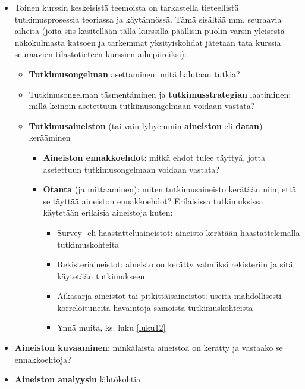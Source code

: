 \documentclass[
]{book}
\providecommand{\tightlist}{%
  \setlength{\itemsep}{0pt}\setlength{\parskip}{0pt}}
\begin{document}
\begin{itemize}
\tightlist
\item
  Toinen kurssin keskeisistä teemoista on tarkastella tieteellistä tutkimusprosessia teoriassa ja käytännössä. Tämä sisältää mm. seuraavia aiheita (joita siis käsitellään tällä kurssilla päällisin puolin varsin yleisestä näkökulmasta katsoen ja tarkemmat yksityiskohdat jätetään tätä kurssia seuraavien tilastotieteen kurssien aihepiireiksi):

  \begin{itemize}
  \tightlist
  \item
    \textbf{Tutkimusongelman} asettaminen: mitä halutaan tutkia?
  \item
    Tutkimusongelman täsmentäminen ja \textbf{tutkimusstrategian} laatiminen: millä keinoin asetettuun tutkimusongelmaan voidaan vastata?
  \item
    \textbf{Tutkimusaineiston} (tai vain lyhyemmin \textbf{aineiston} eli \textbf{datan}) kerääminen

    \begin{itemize}
    \tightlist
    \item
      \textbf{Aineiston ennakkoehdot}: mitkä ehdot tulee täyttyä, jotta asetettuun tutkimusongelmaan voidaan vastata?
    \item
      \textbf{Otanta} (ja mittaaminen): miten tutkimusaineisto kerätään niin, että se täyttää aineiston ennakkoehdot? Erilaisissa tutkimuksissa käytetään erilaisia aineistoja kuten:

      \begin{itemize}
      \tightlist
      \item
        Survey- eli haastatteluaineistot: aineisto kerätään haastattelemalla tutkimuskohteita
      \item
        Rekisteriaineistot: aineisto on kerätty valmiiksi rekisteriin ja sitä käytetään tutkimukseen
      \item
        Aikasarja-aineistot tai pitkittäisaineistot: useita mahdollisesti korreloituneita havaintoja samoista tutkimuskohteista
      \item
        Ynnä muita, ks. luku \ref{luku12}
      \end{itemize}
    \end{itemize}
  \end{itemize}
\item
  \textbf{Aineiston kuvaaminen}: minkälaista aineistoa on kerätty ja vastaako se ennakkoehtoja?
\item
  \textbf{Aineiston analyysin} lähtökohtia


\end{itemize}
\end{document}
